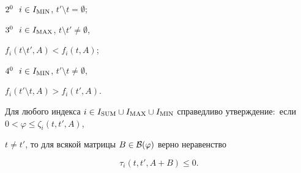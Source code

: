 $2^0\ \ i\in I_{\operatorname{MIN}}$, $t'\setminus t=\emptyset$;





$3^0\ \ i\in I_{\operatorname{MAX}}$, $t\setminus t'\ne\emptyset$,


$f_i(t\setminus t',A)<f_i(t,A)$;





$4^0\ \ i\in I_{\operatorname{MIN}}$, $t'\setminus t\ne\emptyset$,


$f_i(t'\setminus t,A)>f_i(t',A)$.





\begin{lem}


Для любого индекса $i \in I_{\SUM}\cup I_{\MAX}\cup


I_{\MIN}$ справедливо утверждение$:$ если $ 0<\varphi\leq \zeta_{i}(t,t',A)$,


$t\ne t'$, то для всякой матрицы $B \in \cal B(\varphi)$ верно неравенство


$$


\tau_{i}(t,t',A+B)\le 0.


$$


\end{lem}





